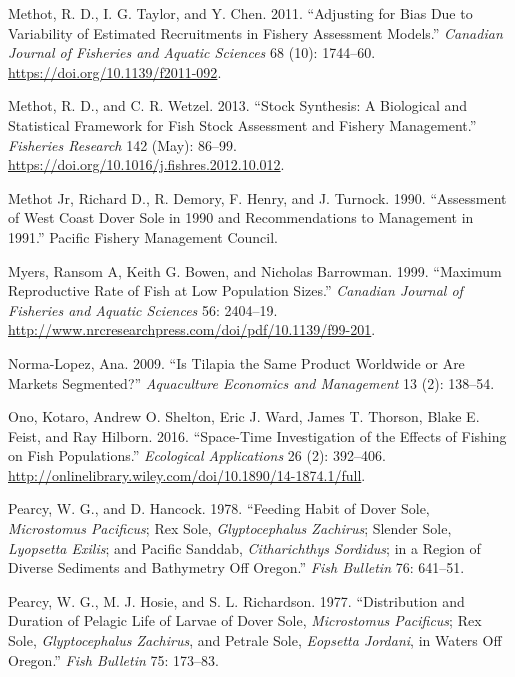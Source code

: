 \documentclass[11pt,
  english,
  a4paper,
]{article}
\begin{document}
\begin{cslreferences}
\leavevmode\hypertarget{ref-methot_adjusting_2011}{}%
Methot, R. D., I. G. Taylor, and Y. Chen. 2011. ``Adjusting for Bias Due to Variability of Estimated Recruitments in Fishery Assessment Models.'' \emph{Canadian Journal of Fisheries and Aquatic Sciences} 68 (10): 1744--60. \url{https://doi.org/10.1139/f2011-092}.

\leavevmode\hypertarget{ref-methot_stock_2013}{}%
Methot, R. D., and C. R. Wetzel. 2013. ``Stock Synthesis: A Biological and Statistical Framework for Fish Stock Assessment and Fishery Management.'' \emph{Fisheries Research} 142 (May): 86--99. \url{https://doi.org/10.1016/j.fishres.2012.10.012}.

\leavevmode\hypertarget{ref-methot_jr_assessment_1990}{}%
Methot Jr, Richard D., R. Demory, F. Henry, and J. Turnock. 1990. ``Assessment of West Coast Dover Sole in 1990 and Recommendations to Management in 1991.'' Pacific Fishery Management Council.

\leavevmode\hypertarget{ref-myers_maximum_1999}{}%
Myers, Ransom A, Keith G. Bowen, and Nicholas Barrowman. 1999. ``Maximum Reproductive Rate of Fish at Low Population Sizes.'' \emph{Canadian Journal of Fisheries and Aquatic Sciences} 56: 2404--19. \url{http://www.nrcresearchpress.com/doi/pdf/10.1139/f99-201}.

\leavevmode\hypertarget{ref-norma-lopez_is_2009}{}%
Norma-Lopez, Ana. 2009. ``Is Tilapia the Same Product Worldwide or Are Markets Segmented?'' \emph{Aquaculture Economics and Management} 13 (2): 138--54.

\leavevmode\hypertarget{ref-ono_space-time_2016}{}%
Ono, Kotaro, Andrew O. Shelton, Eric J. Ward, James T. Thorson, Blake E. Feist, and Ray Hilborn. 2016. ``Space-Time Investigation of the Effects of Fishing on Fish Populations.'' \emph{Ecological Applications} 26 (2): 392--406. \url{http://onlinelibrary.wiley.com/doi/10.1890/14-1874.1/full}.

\leavevmode\hypertarget{ref-pearcy_feeding_1978}{}%
Pearcy, W. G., and D. Hancock. 1978. ``Feeding Habit of Dover Sole, \emph{Microstomus Pacificus}; Rex Sole, \emph{Glyptocephalus Zachirus}; Slender Sole, \emph{Lyopsetta Exilis}; and Pacific Sanddab, \emph{Citharichthys Sordidus}; in a Region of Diverse Sediments and Bathymetry Off Oregon.'' \emph{Fish Bulletin} 76: 641--51.

\leavevmode\hypertarget{ref-pearcy_distribution_1977}{}%
Pearcy, W. G., M. J. Hosie, and S. L. Richardson. 1977. ``Distribution and Duration of Pelagic Life of Larvae of Dover Sole, \emph{Microstomus Pacificus}; Rex Sole, \emph{Glyptocephalus Zachirus}, and Petrale Sole, \emph{Eopsetta Jordani}, in Waters Off Oregon.'' \emph{Fish Bulletin} 75: 173--83.


\end{cslreferences}
\end{document}
